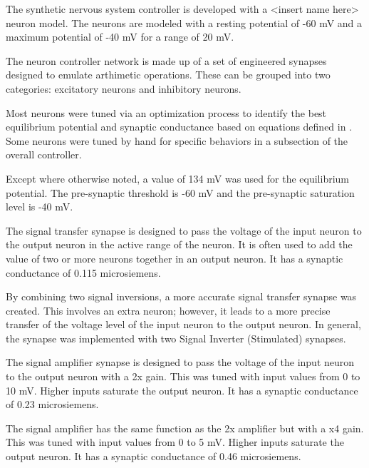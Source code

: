 The synthetic nervous system controller is developed with a <insert name here>
neuron model. The neurons are modeled with a resting potential of -60 mV and a
maximum potential of -40 mV for a range of 20 mV.



The neuron controller network is made up of a set of engineered synapses
designed to emulate arthimetic operations. These can be grouped into two
categories: excitatory neurons and inhibitory neurons. 

Most neurons were tuned
via an optimization process to identify the best equilibrium potential and
synaptic conductance based on equations defined in 
\cite{NickFunctionalSubnetwork}. 
Some neurons were tuned by hand for specific behaviors in
a subsection of the overall controller.


Except where otherwise noted, a value of 134 mV was used for the equilibrium
potential. The pre-synaptic threshold is -60 mV and the pre-synaptic saturation
level is -40 mV.


The signal transfer synapse is designed to pass the voltage of the input neuron
to the output neuron in the active range of the neuron. It is often used to add
the value of two or more neurons together in an output neuron.
It has a synaptic 
conductance of 0.115 microsiemens. 


By combining two signal inversions, a more accurate signal transfer synapse was
created. This involves an extra neuron; however, it leads to a more precise
transfer of the voltage level of the input neuron to the output neuron. In
general, the synapse was implemented with two Signal Inverter (Stimulated)
synapses.


The signal amplifier synapse is designed to pass the voltage of the input neuron
to the output neuron with a 2x gain. This was tuned with input values from 0 to
10 mV. Higher inputs saturate the output neuron. It has a synaptic conductance
of 0.23 microsiemens.


The signal amplifier has the same function as the 2x amplifier but with a x4 
gain. This was tuned with input values from 0 to
5 mV. Higher inputs saturate the output neuron. It has a synaptic conductance
of 0.46 microsiemens.

